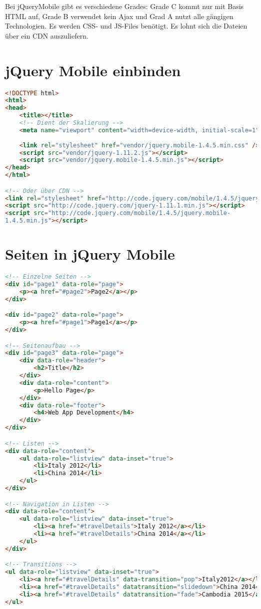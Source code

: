 Bei jQueryMobile gibt es verschiedene Grades: Grade C kommt nur mit Basis HTML auf, Grade B verwendet kein Ajax und Grad A nutzt alle gängigen Technologien. Es werden CSS- und JS-Files benötigt. Es lohnt sich die Dateien über ein CDN auszuliefern.

\section{jQuery Mobile einbinden}
\begin{lstlisting}[language=HTML,label=lst:jquery-einbinden,caption=Einbinden von jQuery Mobile]
<!DOCTYPE html>
<html>
<head>
	<title></title>
	<!-- Dient der Skalierung -->
	<meta name="viewport" content="width=device-width, initial-scale=1">
	
	<link rel="stylesheet" href="vendor/jquery.mobile-1.4.5.min.css" />
	<script src="vendor/jquery-1.11.2.js"></script>
	<script src="vendor/jquery.mobile-1.4.5.min.js"></script>
</head>
</html>

<!-- Oder über CDN -->
<link rel="stylesheet" href="http://code.jquery.com/mobile/1.4.5/jquery.mobile-1.4.5.min.css" />
<script src="http://code.jquery.com/jquery-1.11.1.min.js"></script>
<script src="http://code.jquery.com/mobile/1.4.5/jquery.mobile-
1.4.5.min.js"></script>
\end{lstlisting}

\section{Seiten in jQuery Mobile}
\begin{lstlisting}[language=HTML,label=lst:jquery-seiten,caption=Seiten in jQuery Mobile]
<!-- Einzelne Seiten -->
<div id="page1" data-role="page">
	<p><a href="#page2">Page2</a></p>
</div>

<div id="page2" data-role="page">
	<p><a href="#page1">Page1</a></p>
</div>

<!-- Seitenaufbau -->
<div id="page3" data-role="page">
	<div data-role="header">
		<h2>Title</h2>
	</div>
	<div data-role="content">
		<p>Hello Page</p>
	</div>
	<div data-role="footer">
		<h4>Web App Development</h4>
	</div>
</div>

<!-- Listen -->
<div data-role="content">
	<ul data-role="listview" data-inset="true">
		<li>Italy 2012</li>
		<li>China 2014</li>
	</ul>
</div>

<!-- Navigation in Listen -->
<div data-role="content">
	<ul data-role="listview" data-inset="true">
		<li><a href="#travelDetails">Italy 2012</a></li>
		<li><a href="#travelDetails">China 2014</a></li>
	</ul>
</div>

<!-- Transitions -->
<ul data-role="listview" data-inset="true">
	<li><a href="#travelDetails" data-transition="pop">Italy2012</a></li>
	<li><a href="#travelDetails" datatransition="slidedown">China 2014</a></li>
	<li><a href="#travelDetails" datatransition="fade">Cambodia 2015</a></li>
</ul>
\end{lstlisting}

